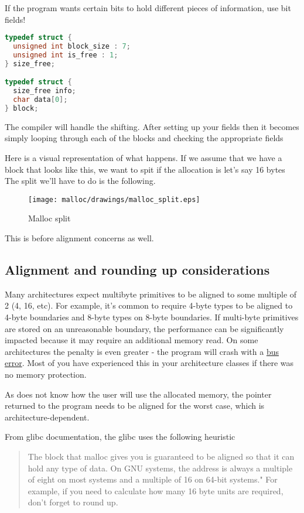 If the program wants certain bits to hold different pieces of information, use bit fields!

\begin{lstlisting}[language=C]
typedef struct {
  unsigned int block_size : 7;
  unsigned int is_free : 1;
} size_free;

typedef struct {
  size_free info;
  char data[0];
} block;
\end{lstlisting}

The compiler will handle the shifting.
After setting up your fields then it becomes simply looping through each of the blocks and checking the appropriate fields

Here is a visual representation of what happens.
If we assume that we have a block that looks like this, we want to spit if the allocation is let's say 16 bytes
The split we'll have to do is the following.

\begin{figure}[H]
\centering
\texttt{[image: malloc/drawings/malloc\_split.eps]}
\caption{Malloc split}
\end{figure}

This is before alignment concerns as well.

\subsection{Alignment and rounding up considerations}

Many architectures expect multibyte primitives to be aligned to some multiple of 2 (4, 16, etc).
For example, it's common to require 4-byte types to be aligned to 4-byte boundaries and 8-byte types on 8-byte boundaries.
If multi-byte primitives are stored on an unreasonable boundary, the performance can be significantly impacted because it may require an additional memory read.
On some architectures the penalty is even greater - the program will crash with a \href{http://en.wikipedia.org/wiki/Bus_error\#Unaligned_access}{bus error}.
Most of you have experienced this in your architecture classes if there was no memory protection.

As  does not know how the user will use the allocated memory, the pointer returned to the program needs to be aligned for the worst case, which is architecture-dependent.

From glibc documentation, the glibc  uses the following heuristic \cite{vma_paging}

\begin{quote}
The block that malloc gives you is guaranteed to be aligned so that it can hold any type of data. On GNU systems, the address is always a multiple of eight on most systems and a multiple of 16 on 64-bit systems." For example, if you need to calculate how many 16 byte units are required, don't forget to round up.
\end{quote}

